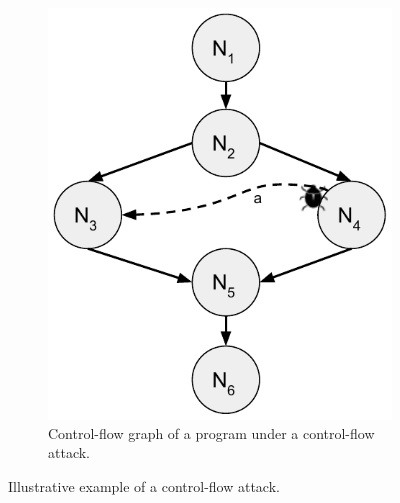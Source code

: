 \begin{figure}[t]
\begin{subfigure}[t]{0.4\textwidth}
		\includegraphics[width=\linewidth]{fig_c4/problem-setting-graph.pdf}
		\caption{Control-flow graph of a program under a control-flow attack.}
		\label{fig:problem-setting-graph}
	\end{subfigure}
	\caption[Example of control-flow attack.]{Illustrative example of a 
	control-flow attack.}
	\label{fig:problem-setting}
\end{figure}

